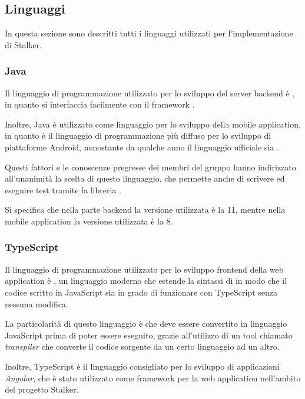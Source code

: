 \documentclass[../../../manuale-sviluppatore.tex]{subfiles}
\begin{document}
\subsection{Linguaggi}%
\label{sub:linguaggi}
In questa sezione sono descritti tutti i linguaggi utilizzati per l'implementazione di Stalker.

\subsubsection{Java}%
\label{subs:java}

Il linguaggio di programmazione utilizzato per lo sviluppo del server backend è , in quanto si interfaccia facilmente con il framework .

Inoltre, Java è utilizzato come linguaggio per lo sviluppo della mobile application, in quanto è il linguaggio di programmazione più diffuso per lo sviluppo di piattaforme Android, nonostante da qualche anno il linguaggio ufficiale sia .

Questi fattori e le conoscenze pregresse dei membri del gruppo hanno indirizzato all'unanimità la scelta di questo linguaggio, che permette anche di scrivere ed eseguire test tramite la libreria .

Si specifica che nella parte backend la versione utilizzata è la 11, mentre nella mobile application la versione utilizzata è la 8.

\subsubsection{TypeScript}%
\label{subs:typescript}

Il linguaggio di programmazione utilizzato per lo sviluppo frontend della web application è , un linguaggio moderno che estende la sintassi di  in modo che il codice scritto in JavaScript sia in grado di funzionare con TypeScript senza nessuna modifica.

La particolarità di questo linguaggio è che deve essere convertito in linguaggio JavaScript prima di poter essere eseguito, grazie all'utilizzo di un tool chiamato \textit{transpiler} che converte il codice sorgente da un certo linguaggio ad un altro.

Inoltre, TypeScript è il linguaggio consigliato per lo sviluppo di applicazioni \textit{Angular}, che è stato utilizzato come framework per la web application nell'ambito del progetto Stalker.
\end{document}
